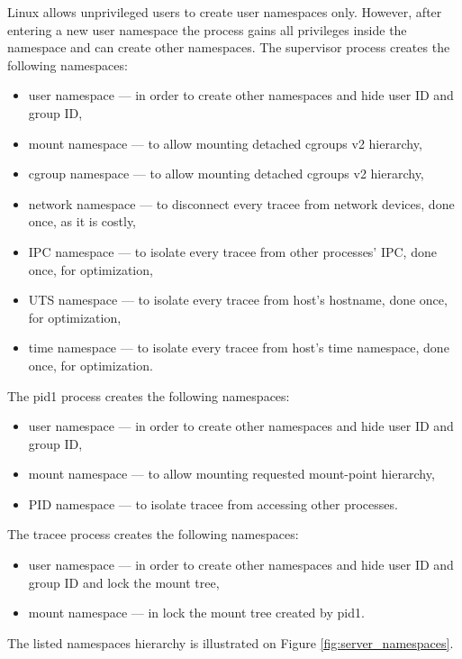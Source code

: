 \documentclass[en]{pracamgr}
\begin{document}
Linux allows unprivileged users to create user namespaces only. However, after entering a new user namespace the process gains all privileges inside the namespace and can create other namespaces.
\newline
The supervisor process creates the following namespaces:
\begin{itemize}
    \item user namespace --- in order to create other namespaces and hide user ID and group ID,
    \item mount namespace --- to allow mounting detached cgroups v2 hierarchy,
    \item cgroup namespace --- to allow mounting detached cgroups v2 hierarchy,
    \item network namespace --- to disconnect every tracee from network devices, done once, as it is costly,
    \item IPC namespace --- to isolate every tracee from other processes' IPC, done once, for optimization,
    \item UTS namespace --- to isolate every tracee from host's hostname, done once, for optimization,
    \item time namespace --- to isolate every tracee from host's time namespace, done once, for optimization.
\end{itemize}
The pid1 process creates the following namespaces:
\begin{itemize}
    \item user namespace --- in order to create other namespaces and hide user ID and group ID,
    \item mount namespace --- to allow mounting requested mount-point hierarchy,
    \item PID namespace --- to isolate tracee from accessing other processes.
\end{itemize}
The tracee process creates the following namespaces:
\begin{itemize}
    \item user namespace --- in order to create other namespaces and hide user ID and group ID and lock the mount tree,
    \item mount namespace --- in lock the mount tree created by pid1.
\end{itemize}
The listed namespaces hierarchy is illustrated on Figure \ref{fig:server_namespaces}.
\end{document}
